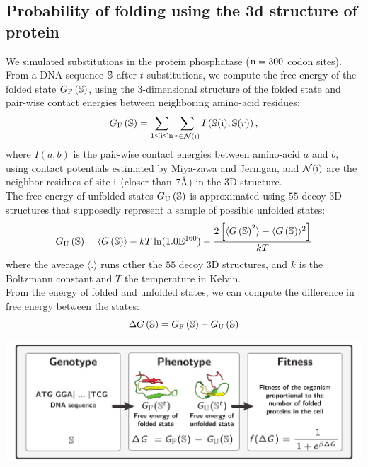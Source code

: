 \documentclass{article}
\begin{document}
\subsection{Probability of folding using the 3d structure of protein}
We simulated substitutions in the protein phosphatase ($\text{n}=300$ codon sites).
From a DNA sequence $\mathbb{S}$ after $t$ substitutions, we compute the free energy of the folded state $G_{\mathrm{F}}\left(\mathbb{S}\right)$, using the $3$-dimensional structure of the folded state and pair-wise contact energies between neighboring amino-acid residues:
\begin{equation}
G_{\mathrm{F}}\left(\mathbb{S}\right) = \sum_{1 \leq \text{i} \leq \text{n}} \sum_{r \in \mathcal{N}(\text{i})} I \left(\mathbb{S}(\text{i}), \mathbb{S}(r) \right),
\end{equation}
where $I(a,b)$ is the pair-wise contact energies between amino-acid $a$ and $b$, using contact potentials estimated by Miya-zawa and Jernigan, and $\mathcal{N}(\text{i})$ are the neighbor residues of site $\text{i}$ (closer than $7\text{\normalfont\AA}$) in the $3$D structure.\\
The free energy of unfolded states $G_{\mathrm{U}}\left(\mathbb{S}\right)$ is approximated using $55$ decoy $3$D structures that supposedly represent a sample of possible unfolded states:
\begin{equation}
G_{\mathrm{U}}\left(\mathbb{S}\right) = \langle G\left(\mathbb{S}\right) \rangle - kT \ln (1.0\mathrm{E}^{160}) - \frac{2 \left[ \langle G\left(\mathbb{S}\right)^2 \rangle - \langle G\left(\mathbb{S}\right) \rangle^2\right] }{kT}
\end{equation}
where the average $\langle . \rangle$ runs other the $55$ decoy $3$D structures, and $k$ is the Boltzmann constant and $T$ the temperature in Kelvin.\\
From the energy of folded and unfolded states, we can compute the difference in free energy between the states:
\begin{equation}
\Delta G\left(\mathbb{S}\right) = G_{\mathrm{F}}\left(\mathbb{S}\right) - G_{\mathrm{U}}\left(\mathbb{S}\right)
\end{equation}
\begin{center}
 \includegraphics[width=165mm] {artworks/ModelSimuFold.pdf}
\end{center}
\end{document}
